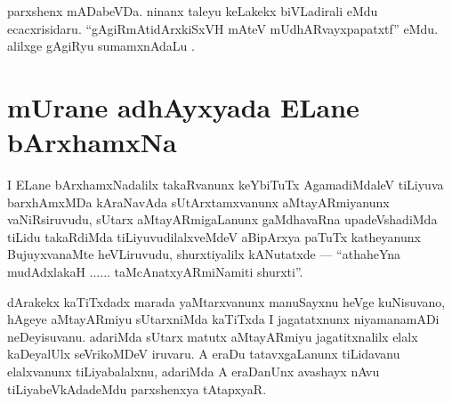 \begin{artha}
parxshenx mADabeVDa. ninanx taleyu keLakekx biVLadirali eMdu ecacxrisidaru. ``gAgiRmAtidArxkiSxVH mAteV mUdhARvayxpapatxtf'' eMdu. alilxge gAgiRyu sumamxnAdaLu .
\end{artha}


\section*{mUrane adhAyxyada ELane bArxhamxNa}


\begin{artha}
I ELane bArxhamxNadalilx takaRvanunx keYbiTuTx AgamadiMdaleV tiLiyuva barxhAmxMDa kAraNavAda sUtArxtamxvanunx aMtayARmiyanunx vaNiRsiruvudu, sUtarx aMtayARmigaLanunx gaMdhavaRna upadeVshadiMda tiLidu takaRdiMda tiLiyuvudilalxveMdeV aBipArxya paTuTx katheyanunx BujuyxvanaMte heVLiruvudu, shurxtiyalilx kANutatxde --- ``athaheYna mudAdxlakaH ...... taMcAnatxyARmiNamiti shurxti''.
\end{artha}


\begin{artha}
dArakekx kaTiTxdadx marada yaMtarxvanunx manuSayxnu heVge kuNisuvano, hAgeye aMtayARmiyu sUtarxniMda kaTiTxda I jagatatxnunx niyamanamADi neDeyisuvanu. adariMda sUtarx matutx aMtayARmiyu jagatitxnalilx elalx kaDeyalUlx seVrikoMDeV iruvaru. A eraDu tatavxgaLanunx tiLidavanu elalxvanunx tiLiyabalalxnu, adariMda A eraDanUnx avashayx nAvu tiLiyabeVkAdadeMdu parxshenxya tAtapxyaR.
\end{artha}


